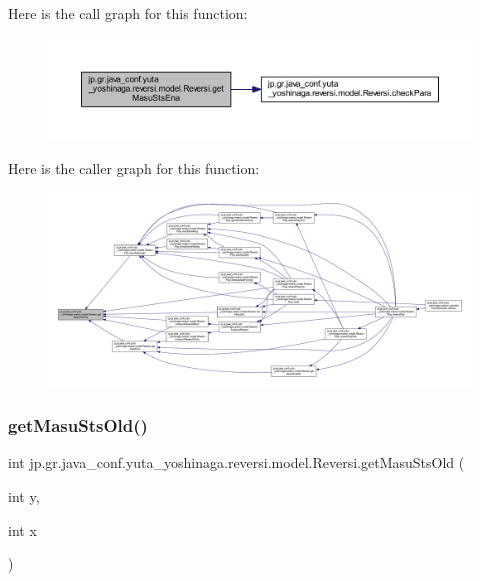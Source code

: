 Here is the call graph for this function\+:\nopagebreak
\begin{figure}[H]
\begin{center}
\leavevmode
\includegraphics[width=350pt]{classjp_1_1gr_1_1java__conf_1_1yuta__yoshinaga_1_1reversi_1_1model_1_1_reversi_a055f20327e781b1f6807dba0baa1e51b_cgraph}
\end{center}
\end{figure}
Here is the caller graph for this function\+:\nopagebreak
\begin{figure}[H]
\begin{center}
\leavevmode
\includegraphics[width=350pt]{classjp_1_1gr_1_1java__conf_1_1yuta__yoshinaga_1_1reversi_1_1model_1_1_reversi_a055f20327e781b1f6807dba0baa1e51b_icgraph}
\end{center}
\end{figure}
\mbox{\label{classjp_1_1gr_1_1java__conf_1_1yuta__yoshinaga_1_1reversi_1_1model_1_1_reversi_a051aca9eb7ac3ce375a6c017fd0eb400}} 
\subsubsection{\texorpdfstring{get\+Masu\+Sts\+Old()}{getMasuStsOld()}}
{\footnotesize\ttfamily int jp.\+gr.\+java\+\_\+conf.\+yuta\+\_\+yoshinaga.\+reversi.\+model.\+Reversi.\+get\+Masu\+Sts\+Old (\begin{DoxyParamCaption}\item[{int}]{y,  }\item[{int}]{x }\end{DoxyParamCaption})}




